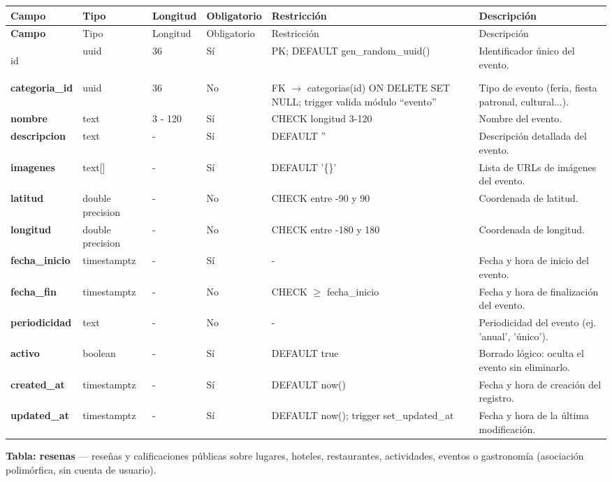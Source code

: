 {\footnotesize
\begin{longtable}{|>{\bfseries}p{3.3cm}|p{2.6cm}|p{1.2cm}|p{1.6cm}|p{2.8cm}|p{4.0cm}|}
\hline
Campo & Tipo & Longitud & Obligatorio & Restricción & Descripción \\ \hline
\endfirsthead
\hline
Campo & Tipo & Longitud & Obligatorio & Restricción & Descripción \\ \hline
\endhead
\hline
\endfoot
\hline
\endlastfoot

id & uuid & 36 & Sí & PK; DEFAULT gen\_random\_uuid() & Identificador único del evento. \\ \hline
categoria\_id & uuid & 36 & No & FK $\rightarrow$ categorias(id) ON DELETE SET NULL; trigger valida módulo ``evento'' & Tipo de evento (feria, fiesta patronal, cultural...). \\ \hline
nombre & text & 3 - 120 & Sí & CHECK longitud 3-120 & Nombre del evento. \\ \hline
descripcion & text & - & Sí & DEFAULT '' & Descripción detallada del evento. \\ \hline
imagenes & text[] & - & Sí & DEFAULT '\{\}' & Lista de URLs de imágenes del evento. \\ \hline
latitud & double precision & - & No & CHECK entre -90 y 90 & Coordenada de latitud. \\ \hline
longitud & double precision & - & No & CHECK entre -180 y 180 & Coordenada de longitud. \\ \hline
fecha\_inicio & timestamptz & - & Sí & - & Fecha y hora de inicio del evento. \\ \hline
fecha\_fin & timestamptz & - & No & CHECK $\geq$ fecha\_inicio & Fecha y hora de finalización del evento. \\ \hline
periodicidad & text & - & No & - & Periodicidad del evento (ej. 'anual', 'único'). \\ \hline
activo & boolean & - & Sí & DEFAULT true & Borrado lógico: oculta el evento sin eliminarlo. \\ \hline
created\_at & timestamptz & - & Sí & DEFAULT now() & Fecha y hora de creación del registro. \\ \hline
updated\_at & timestamptz & - & Sí & DEFAULT now(); trigger set\_updated\_at & Fecha y hora de la última modificación. \\ \hline
\end{longtable}
}

\bigskip
\noindent\textbf{Tabla: resenas} — reseñas y calificaciones públicas sobre lugares, hoteles, restaurantes, actividades, eventos o gastronomía (asociación polimórfica, sin cuenta de usuario).

